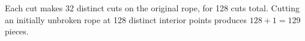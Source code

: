 Each cut makes 32 distinct cuts on the original rope, for 128 cuts total. Cutting an initially unbroken rope at 128 distinct interior points produces $128+1=\boxed{129}$ pieces.
